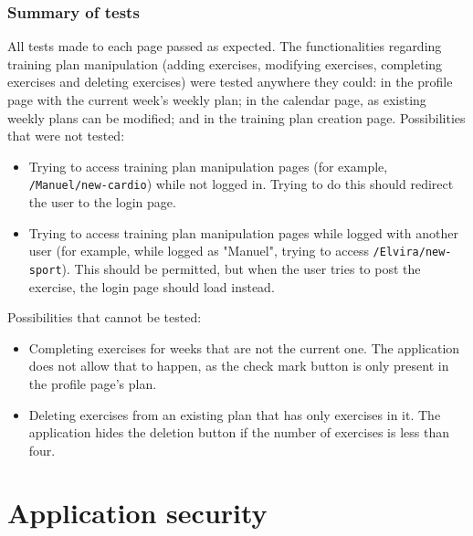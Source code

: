 \documentclass[12pt,twoside,titlepage,a4paper]{article}
\theoremstyle{definicion}
\theoremstyle{lema}
\theoremstyle{teorema}
\theoremstyle{corolario}
\theoremstyle{ejemplo}
\theoremstyle{nota}
\begin{document}
\subsubsection*{Summary of tests}
All tests made to each page passed as expected. The functionalities regarding training plan manipulation (adding exercises,
modifying exercises, completing exercises and deleting exercises) were tested anywhere they could: in the profile page with
the current week's weekly plan; in the calendar page, as existing weekly plans can be modified; and in the training plan
creation page.
\newline\newline
Possibilities that were not tested:
\begin{itemize}
	\item Trying to access training plan manipulation pages (for example, \texttt{/Manuel/new-cardio}) while not logged in.
	Trying to do this should redirect the user to the login page.
	\item Trying to access training plan manipulation pages while logged with another user (for example, while logged as
	"Manuel", trying to access \texttt{/Elvira/new-sport}). This should be permitted, but when the user tries to post the
	exercise, the login page should load instead.
\end{itemize}
Possibilities that cannot be tested:
\begin{itemize}
	\item Completing exercises for weeks that are not the current one. The application does not allow that to happen, as the
	check mark button is only present in the profile page's plan.
	\item Deleting exercises from an existing plan that has only exercises in it. The application hides the deletion button
	if the number of exercises is less than four.
\end{itemize}

\newpage
\section{Application security}
\end{document}
